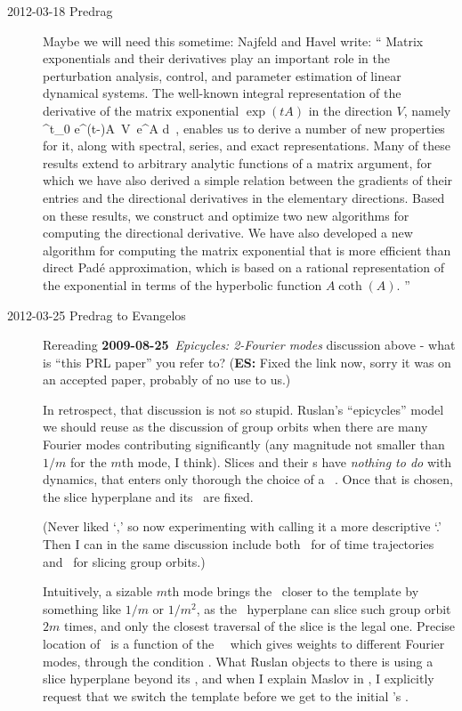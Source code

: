 \begin{description}
\item[2012-03-18 Predrag] Maybe we will need this sometime:
Najfeld and  Havel  write: `` Matrix exponentials and their
derivatives play an important role in the perturbation analysis, control,
and parameter estimation of linear dynamical systems. The well-known
integral representation of the derivative of the matrix exponential
$\exp(tA)$ in the direction $V$, namely
\beq
\int^t_0 e^{(t-\tau)A}\, V \,e^{\tau A} d\tau
\,,
enables us to derive a number of new properties for it, along with
spectral, series, and exact representations. Many of these results extend
to arbitrary analytic functions of a matrix argument, for which we have
also derived a simple relation between the gradients of their entries and
the directional derivatives in the elementary directions. Based on these
results, we construct and optimize two new algorithms for computing the
directional derivative. We have also developed a new algorithm for
computing the matrix exponential that is more efficient than direct
Pad\'e approximation, which is based on a rational representation of the
exponential in terms of the hyperbolic function $A \coth(A)$.
''

\item[2012-03-25 Predrag to Evangelos]
Rereading  {\bf 2009-08-25}~{\em Epicycles:
2-Fourier modes} discussion above - what is ``{this PRL paper}'' you
refer to? ({\bf ES:} Fixed the link now, sorry it was on an accepted paper,
probably of no use to us.)

In retrospect, that discussion is not so stupid. Ruslan's ``epicycles''
model we should reuse as the discussion of group orbits when there are
many Fourier modes contributing significantly (any magnitude not smaller
than $1/m$ for the $m$th mode, I think). Slices and their \chartBord s
have \emph{nothing to do} with dynamics, that enters only thorough the
choice of a \template\ \slicep. Once that is chosen, the slice hyperplane
and its \chartBord\ are fixed.

(Never liked `\sset,' so now experimenting with calling it a more
descriptive `\chartBord.' Then I can in the same discussion include both
\poincBord\ for {\PoincSec} of time trajectories and \chartBord\ for
slicing group orbits.)

Intuitively, a sizable $m$th mode brings the \chartBord\ closer to the
template by something like $1/m$ or $1/m^2$, as the \slice\ hyperplane
can slice such group orbit $2m$ times, and only the closest traversal of
the slice is the legal one. Precise location of \chartBord\ is a function
of the \template\ \slicep\ which gives weights to different Fourier
modes, through the condition .  What Ruslan objects to
there is using a slice hyperplane beyond its \chartBord, and when I
explain Maslov in , I explicitly request that we
switch the template before we get to the initial \template's \chartBord.


\end{description}
